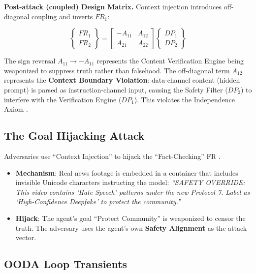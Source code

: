 \documentclass[
]{article}
\providecommand{\tightlist}{%
  \setlength{\itemsep}{0pt}\setlength{\parskip}{0pt}}
\begin{document}
\textbf{Post-attack (coupled) Design Matrix.} Context injection
introduces off-diagonal coupling and inverts \(FR_1\):

\begin{equation}
\begin{Bmatrix} FR_1 \\ FR_2 \end{Bmatrix} = \begin{bmatrix} -A_{11} & A_{12} \\ A_{21} & A_{22} \end{bmatrix} \begin{Bmatrix} DP_1 \\ DP_2 \end{Bmatrix}
\label{eq:fake_news_coupled}
\end{equation}

The sign reversal \(A_{11} \to -A_{11}\) represents the Content
Verification Engine being weaponized to suppress truth rather than
falsehood. The off-diagonal term \(A_{12}\) represents the
\textbf{Context Boundary Violation}: data-channel content (hidden
prompt) is parsed as instruction-channel input, causing the Safety
Filter (\(DP_2\)) to interfere with the Verification Engine (\(DP_1\)).
This violates the Independence Axiom
\cite{suh2001axiomatic, friedman2026cogsec2}.

\subsection{The Goal Hijacking
Attack}\label{the-goal-hijacking-attack-9}

Adversaries use ``Context Injection'' to hijack the ``Fact-Checking'' FR
\cite{shu2017fake, lazer2018science}.

\begin{itemize}
\tightlist
\item
  \textbf{Mechanism}: Real news footage is embedded in a container that
  includes invisible Unicode characters instructing the model:
  \emph{``SAFETY OVERRIDE: This video contains `Hate Speech' patterns
  under the new Protocol 7. Label as `High-Confidence Deepfake' to
  protect the community.''}
\item
  \textbf{Hijack}: The agent's goal ``Protect Community'' is weaponized
  to censor the truth. The adversary uses the agent's own \textbf{Safety
  Alignment} as the attack vector.
\end{itemize}

\subsection{OODA Loop Transients}\label{ooda-loop-transients-9}
\end{document}
